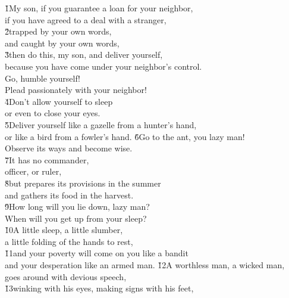 \begin{poetry}
\poeml {}
\v{1}My son, if you guarantee a loan for your neighbor, \\
\poeml if you have agreed to a deal with a stranger, \\
\poeml \v{2}trapped by your own words, \\
\poemll    and caught by your own words, \\
\poeml \v{3}then do this, my son, and deliver yourself, \\
\poemll    because you have come under your neighbor's control. \\
\poeml Go, humble yourself! \\
\poemll    Plead passionately with your neighbor! \\
\poeml \v{4}Don't allow yourself to sleep \\
\poemll    or even to close your eyes. \\
\poeml \v{5}Deliver yourself like a gazelle from a hunter's hand, \\
\poemll    or like a bird from a fowler's hand.
\poeml \v{6}Go to the ant, you lazy man! \\
\poemll    Observe its ways and become wise. \\
\poeml \v{7}It has no commander, \\
\poemll    officer, or ruler, \\
\poeml \v{8}but prepares its provisions in the summer \\
\poemll    and gathers its food in the harvest. \\
\poeml \v{9}How long will you lie down, lazy man? \\
\poemll    When will you get up from your sleep? \\
\poeml \v{10}A little sleep, a little slumber, \\
\poemll    a little folding of the hands to rest, \\
\poeml \v{11}and your poverty will come on you like a bandit \\
\poemll    and your desperation like an armed man.
\poeml \v{12}A worthless man, a wicked man, \\
\poemll    goes around with devious speech, \\
\poeml \v{13}winking with his eyes, making signs with his feet, \\

\end{poetry}
